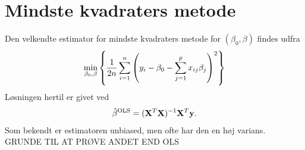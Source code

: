 \section{Mindste kvadraters metode}
%
Den velkendte estimator for mindste kvadraters metode for $(\beta_0, \beta)$ findes udfra
\begin{align*}
\min_{\beta_0, \beta} \cbr{\frac{1}{2n} \sum_{i=1}^n \del{y_i - \beta_0 - \sum_{j=1}^p x_{ij} \beta_j}^2}
\end{align*}
Løsningen hertil er givet ved
\begin{align*}
\hat{\beta}^{\text{OLS}} = (\mathbf{X}^T \mathbf{X})^{-1} \mathbf{X}^T \mathbf{y}.
\end{align*}
Som bekendt er estimatoren unbiased, men ofte har den en høj varians.
GRUNDE TIL AT PRØVE ANDET END OLS






 